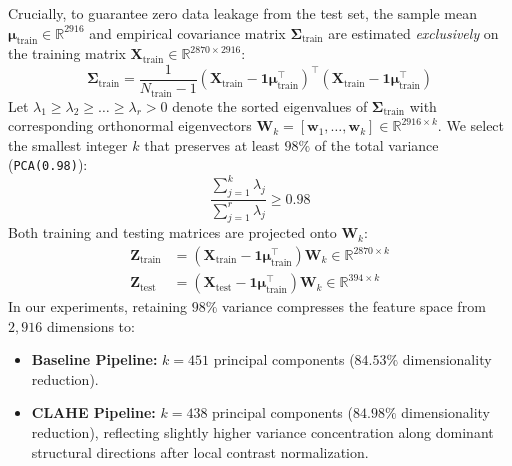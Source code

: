 \documentclass[conference]{IEEEtran}
\begin{document}
Crucially, to guarantee zero data leakage from the test set, the sample mean $\boldsymbol{\mu}_{\text{train}} \in \mathbb{R}^{2916}$ and empirical covariance matrix $\boldsymbol{\Sigma}_{\text{train}}$ are estimated \emph{exclusively} on the training matrix $\mathbf{X}_{\text{train}} \in \mathbb{R}^{2870 \times 2916}$:
\begin{equation}
    \boldsymbol{\Sigma}_{\text{train}} = \frac{1}{N_{\text{train}} - 1} (\mathbf{X}_{\text{train}} - \mathbf{1}\boldsymbol{\mu}_{\text{train}}^\top)^\top (\mathbf{X}_{\text{train}} - \mathbf{1}\boldsymbol{\mu}_{\text{train}}^\top)
\end{equation}
Let $\lambda_1 \ge \lambda_2 \ge \dots \ge \lambda_r > 0$ denote the sorted eigenvalues of $\boldsymbol{\Sigma}_{\text{train}}$ with corresponding orthonormal eigenvectors $\mathbf{W}_k = [\mathbf{w}_1, \dots, \mathbf{w}_k] \in \mathbb{R}^{2916 \times k}$. We select the smallest integer $k$ that preserves at least $98\%$ of the total variance (\texttt{PCA(0.98)}):
\begin{equation}
    \frac{\sum_{j=1}^{k} \lambda_j}{\sum_{j=1}^{r} \lambda_j} \ge 0.98
\end{equation}
Both training and testing matrices are projected onto $\mathbf{W}_k$:
\begin{align}
    \mathbf{Z}_{\text{train}} &= (\mathbf{X}_{\text{train}} - \mathbf{1}\boldsymbol{\mu}_{\text{train}}^\top)\mathbf{W}_k \in \mathbb{R}^{2870 \times k} \\
    \mathbf{Z}_{\text{test}}  &= (\mathbf{X}_{\text{test}}  - \mathbf{1}\boldsymbol{\mu}_{\text{train}}^\top)\mathbf{W}_k \in \mathbb{R}^{394 \times k}
\end{align}
In our experiments, retaining $98\%$ variance compresses the feature space from $2,916$ dimensions to:
\begin{itemize}
    \item \textbf{Baseline Pipeline:} $k = 451$ principal components ($84.53\%$ dimensionality reduction).
    \item \textbf{CLAHE Pipeline:} $k = 438$ principal components ($84.98\%$ dimensionality reduction), reflecting slightly higher variance concentration along dominant structural directions after local contrast normalization.
\end{itemize}
\end{document}
